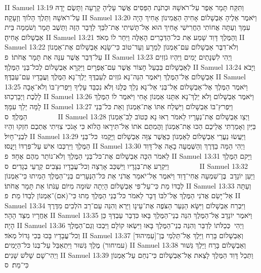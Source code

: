II Samuel 13:19	וַתִּקַּח תָּמָר אֵפֶר עַל־רֹאשָׁהּ וּכְתֹנֶת הַפַּסִּים אֲשֶׁר עָלֶיהָ קָרָעָה וַתָּשֶׂם יָדָהּ עַל־רֹאשָׁהּ וַתֵּלֶךְ הָלוֹךְ וְזָעָקָה׃
II Samuel 13:20	וַיֹּאמֶר אֵלֶיהָ אַבְשָׁלוֹם אָחִיהָ הַאֲמִינוֹן אָחִיךְ הָיָה עִמָּךְ וְעַתָּה אֲחוֹתִי הַחֲרִישִׁי אָחִיךְ הוּא אַל־תָּשִׁיתִי אֶת־לִבֵּךְ לַדָּבָר הַזֶּה וַתֵּשֶׁב תָּמָר וְשֹׁמֵמָה בֵּית אַבְשָׁלוֹם אָחִיהָ׃
II Samuel 13:21	וְהַמֶּלֶךְ דָּוִד שָׁמַע אֵת כּל־הַדְּבָרִים הָאֵלֶּה וַיִּחַר לוֹ מְאֹד׃
II Samuel 13:22	וְלֹא־דִבֶּר אַבְשָׁלוֹם עִם־אַמְנוֹן לְמֵרָע וְעַד־טוֹב כִּי־שָׂנֵא אַבְשָׁלוֹם אֶת־אַמְנוֹן עַל־דְּבַר אֲשֶׁר עִנָּה אֵת תָּמָר אֲחֹתוֹ׃ {פ}
II Samuel 13:23	וַיְהִי לִשְׁנָתַיִם יָמִים וַיִּהְיוּ גֹזְזִים לְאַבְשָׁלוֹם בְּבַעַל חָצוֹר אֲשֶׁר עִם־אֶפְרָיִם וַיִּקְרָא אַבְשָׁלוֹם לְכל־בְּנֵי הַמֶּלֶךְ׃
II Samuel 13:24	וַיָּבֹא אַבְשָׁלוֹם אֶל־הַמֶּלֶךְ וַיֹּאמֶר הִנֵּה־נָא גֹזְזִים לְעַבְדֶּךָ יֵלֶךְ־נָא הַמֶּלֶךְ וַעֲבָדָיו עִם־עַבְדֶּךָ׃
II Samuel 13:25	וַיֹּאמֶר הַמֶּלֶךְ אֶל־אַבְשָׁלוֹם אַל־בְּנִי אַל־נָא נֵלֵךְ כֻּלָּנוּ וְלֹא נִכְבַּד עָלֶיךָ וַיִּפְרץ־בּוֹ וְלֹא־אָבָה לָלֶכֶת וַיְבָרְכֵהוּ׃
II Samuel 13:26	וַיֹּאמֶר אַבְשָׁלוֹם וָלֹא יֵלֶךְ־נָא אִתָּנוּ אַמְנוֹן אָחִי וַיֹּאמֶר לוֹ הַמֶּלֶךְ לָמָּה יֵלֵךְ עִמָּךְ׃
II Samuel 13:27	וַיִּפְרץ־בּוֹ אַבְשָׁלוֹם וַיִּשְׁלַח אִתּוֹ אֶת־אַמְנוֹן וְאֵת כּל־בְּנֵי הַמֶּלֶךְ׃ {ס}        
II Samuel 13:28	וַיְצַו אַבְשָׁלוֹם אֶת־נְעָרָיו לֵאמֹר רְאוּ נָא כְּטוֹב לֵב־אַמְנוֹן בַּיַּיִן וְאָמַרְתִּי אֲלֵיכֶם הַכּוּ אֶת־אַמְנוֹן וַהֲמִתֶּם אֹתוֹ אַל־תִּירָאוּ הֲלוֹא כִּי אָנֹכִי צִוִּיתִי אֶתְכֶם חִזְקוּ וִהְיוּ לִבְנֵי־חָיִל׃
II Samuel 13:29	וַיַּעֲשׂוּ נַעֲרֵי אַבְשָׁלוֹם לְאַמְנוֹן כַּאֲשֶׁר צִוָּה אַבְשָׁלוֹם וַיָּקֻמוּ  כּל־בְּנֵי הַמֶּלֶךְ וַיִּרְכְּבוּ אִישׁ עַל־פִּרְדּוֹ וַיָּנֻסוּ׃
II Samuel 13:30	וַיְהִי הֵמָּה בַדֶּרֶךְ וְהַשְּׁמֻעָה בָאָה אֶל־דָּוִד לֵאמֹר הִכָּה אַבְשָׁלוֹם אֶת־כּל־בְּנֵי הַמֶּלֶךְ וְלֹא־נוֹתַר מֵהֶם אֶחָד׃ {פ}
II Samuel 13:31	וַיָּקם הַמֶּלֶךְ וַיִּקְרַע אֶת־בְּגָדָיו וַיִּשְׁכַּב אָרְצָה וְכל־עֲבָדָיו נִצָּבִים קְרֻעֵי בְגָדִים׃ {ס}        
II Samuel 13:32	וַיַּעַן יוֹנָדָב  בֶּן־שִׁמְעָה אֲחִי־דָוִד וַיֹּאמֶר אַל־יֹאמַר אֲדֹנִי אֵת כּל־הַנְּעָרִים בְּנֵי־הַמֶּלֶךְ הֵמִיתוּ כִּי־אַמְנוֹן לְבַדּוֹ מֵת כִּי־עַל־פִּי אַבְשָׁלוֹם הָיְתָה שׂוּמָה מִיּוֹם עַנֹּתוֹ אֵת תָּמָר אֲחֹתוֹ׃
II Samuel 13:33	וְעַתָּה אַל־יָשֵׂם אֲדֹנִי הַמֶּלֶךְ אֶל־לִבּוֹ דָּבָר לֵאמֹר כּל־בְּנֵי הַמֶּלֶךְ מֵתוּ כִּי־(אם)־אַמְנוֹן לְבַדּוֹ מֵת׃ {פ}
II Samuel 13:34	וַיִּבְרַח אַבְשָׁלוֹם וַיִּשָּׂא הַנַּעַר הַצֹּפֶה אֶת־עֵינָו וַיַּרְא וְהִנֵּה עַם־רַב הֹלְכִים מִדֶּרֶךְ אַחֲרָיו מִצַּד הָהָר׃
II Samuel 13:35	וַיֹּאמֶר יוֹנָדָב אֶל־הַמֶּלֶךְ הִנֵּה בְנֵי־הַמֶּלֶךְ בָּאוּ כִּדְבַר עַבְדְּךָ כֵּן הָיָה׃
II Samuel 13:36	וַיְהִי  כְּכַלֹּתוֹ לְדַבֵּר וְהִנֵּה בְנֵי־הַמֶּלֶךְ בָּאוּ וַיִּשְׂאוּ קוֹלָם וַיִּבְכּוּ וְגַם־הַמֶּלֶךְ וְכל־עֲבָדָיו בָּכוּ בְּכִי גָּדוֹל מְאֹד׃
II Samuel 13:37	וְאַבְשָׁלוֹם בָּרַח וַיֵּלֶךְ אֶל־תַּלְמַי בֶּן־[עַמִּיהוּד] (עמיחור) מֶלֶךְ גְּשׁוּר וַיִּתְאַבֵּל עַל־בְּנוֹ כּל־הַיָּמִים׃
II Samuel 13:38	וְאַבְשָׁלוֹם בָּרַח וַיֵּלֶךְ גְּשׁוּר וַיְהִי־שָׁם שָׁלֹשׁ שָׁנִים׃
II Samuel 13:39	וַתְּכַל דָּוִד הַמֶּלֶךְ לָצֵאת אֶל־אַבְשָׁלוֹם כִּי־נִחַם עַל־אַמְנוֹן כִּי־מֵת׃ {ס}        
